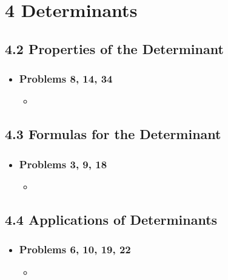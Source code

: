 \chapter{4 Determinants}

\section{4.2 Properties of the Determinant}
\begin{itemize}
  \item[]

  \subsection{Problems 8, 14, 34}
  \begin{itemize}
    \item
  \end{itemize}
\end{itemize}

\section{4.3 Formulas for the Determinant}
\begin{itemize}
  \item []

  \subsection{Problems 3, 9, 18}
  \begin{itemize}
    \item
  \end{itemize}

\end{itemize}

\section{4.4 Applications of Determinants}
\begin{itemize}
  \item []

  \subsection{Problems 6, 10, 19, 22}
  \begin{itemize}
    \item
  \end{itemize}

\end{itemize}
